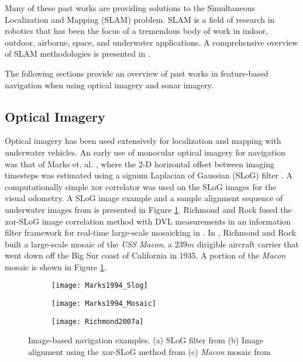 Many of these past works are providing solutions to the Simultaneous Localization and Mapping (SLAM) problem.  
SLAM is a field of research in robotics that has been the focus of a tremendous body of work in indoor, outdoor, airborne, space, and underwater applications.
A comprehensive overview of SLAM methodologies is presented in \cite{Thrun2005}.

The following sections provide an overview of past works in feature-based navigation when using optical imagery and sonar imagery.

\subsection{Optical Imagery}
\label{related.Feature.Optical}

Optical imagery has been used extensively for localization and mapping with underwater vehicles.
An early use of monocular optical imagery for navigation was that of Marks et. al. \cite{Marks1994},  where the 2-D horizontal offset between imaging timesteps was estimated using a signum Laplacian of Gaussian (SLoG) filter \cite{Marks1994}.
A computationally simple xor correlator was used on the SLoG images for the visual odometry.
A SLoG image example and a sample alignment sequence of underwater images from \cite{Marks1994} is presented in Figure \ref{fig:MarksRichmond}.
Richmond and Rock fused the xor-SLoG image correlation method with DVL measurements in an information filter framework for real-time large-scale mosaicking in \cite{Richmond2006}.
In \cite{Richmond2007a}, Richmond and Rock built a large-scale mosaic of the \emph{USS Macon}, a $239m$ dirigible aircraft carrier that went down off the Big Sur coast of California in 1935.
A portion of the \emph{Macon} mosaic is shown in Figure \ref{fig:MarksRichmond}.

\begin{figure}[!h!]  	
	\centering
	\begin{subfigure}[b]{0.2\textwidth}
		\texttt{[image: Marks1994\_Slog]}
		\caption{}
 	 \end{subfigure}
  	\hspace{1ex}	
	\centering
	\begin{subfigure}[b]{0.29\textwidth}
                \texttt{[image: Marks1994\_Mosaic]}
                \caption{}
  	\end{subfigure}
  	\hspace{1ex}
  	\centering
	\begin{subfigure}[b]{0.44\textwidth}
                \texttt{[image: Richmond2007a]}
                \caption{}
  	\end{subfigure}

  	\caption{Image-based navigation examples. (a) SLoG filter from \cite{Marks1994} (b) Image alignment using the xor-SLoG method from \cite{Marks1994} (c) \emph{Macon} mosaic from \cite{Richmond2007a} }
  	\label{fig:MarksRichmond}
\end{figure}


